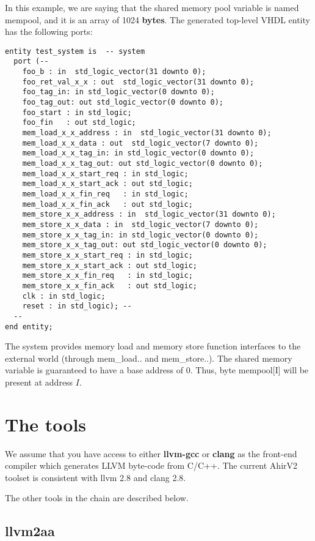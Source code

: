 In this example, we are saying that the shared memory pool
variable is named mempool, and it is an array of 1024 {\bf bytes}.
The generated top-level VHDL entity has the following
ports:
\begin{verbatim}
entity test_system is  -- system
  port (--
    foo_b : in  std_logic_vector(31 downto 0);
    foo_ret_val_x_x : out  std_logic_vector(31 downto 0);
    foo_tag_in: in std_logic_vector(0 downto 0);
    foo_tag_out: out std_logic_vector(0 downto 0);
    foo_start : in std_logic;
    foo_fin   : out std_logic;
    mem_load_x_x_address : in  std_logic_vector(31 downto 0);
    mem_load_x_x_data : out  std_logic_vector(7 downto 0);
    mem_load_x_x_tag_in: in std_logic_vector(0 downto 0);
    mem_load_x_x_tag_out: out std_logic_vector(0 downto 0);
    mem_load_x_x_start_req : in std_logic;
    mem_load_x_x_start_ack : out std_logic;
    mem_load_x_x_fin_req   : in std_logic;
    mem_load_x_x_fin_ack   : out std_logic;
    mem_store_x_x_address : in  std_logic_vector(31 downto 0);
    mem_store_x_x_data : in  std_logic_vector(7 downto 0);
    mem_store_x_x_tag_in: in std_logic_vector(0 downto 0);
    mem_store_x_x_tag_out: out std_logic_vector(0 downto 0);
    mem_store_x_x_start_req : in std_logic;
    mem_store_x_x_start_ack : out std_logic;
    mem_store_x_x_fin_req   : in std_logic;
    mem_store_x_x_fin_ack   : out std_logic;
    clk : in std_logic;
    reset : in std_logic); --
  --
end entity;
\end{verbatim}

The system provides  memory load and memory store
function interfaces to the external world 
(through  mem\_load.. and mem\_store..).
The shared memory variable is guaranteed to have a base address of $0$.  Thus,
byte mempool[I] will be present at address $I$.

\section{The tools}

We assume that you have access to either {\bf llvm-gcc}
or {\bf clang} as the front-end compiler which generates
LLVM byte-code from C/C++.  The current AhirV2 toolset
is consistent with llvm 2.8 and clang 2.8.

The other tools in the chain are described below.

\subsection{{\bf llvm2aa}}


